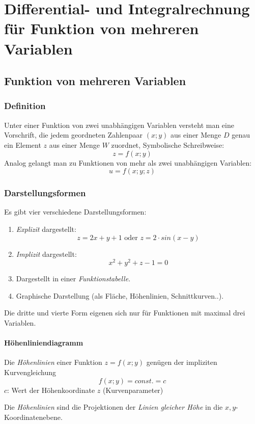 \chapter{Differential- und Integralrechnung für Funktion von mehreren Variablen}
\section{Funktion von mehreren Variablen}
\subsection{Definition}
\begin{definition}
Unter einer Funktion von zwei unabhängigen Variablen versteht man eine Vorschrift, die jedem geordneten Zahlenpaar $(x;y)$ aus einer Menge $D$ genau ein Element $z$ aus einer Menge $W$ zuordnet, Symbolische Schreibweise: $$z=f(x;y)$$
Analog gelangt man zu Funktionen von mehr als zwei unabhängigen Variablen:
$$u=f(x;y;z)$$

\subsection{Darstellungsformen}
Es gibt vier verschiedene Darstellungsformen:
\begin{enumerate}
	\item \textit{Explizit} dargestellt:
	$$z = 2x + y + 1 \text{ oder } z = 2 \cdot sin(x-y)$$
	\item \textit{Implizit} dargestellt:
	$$ x^2 + y^2+z -1 = 0$$
	\item Dargestellt in einer \textit{Funktionstabelle}.
	\item Graphische Darstellung (als Fläche, Höhenlinien, Schnittkurven..).
\end{enumerate}
Die dritte und vierte Form eigenen sich nur für Funktionen mit maximal drei Variablen.
\end{definition}

\subsubsection{Höhenliniendiagramm}
\begin{definition}
Die \textit{Höhenlinien} einer Funktion $z=f(x;y)$ genügen der impliziten Kurvengleichung
$$f(x;y) = const. = c$$
$c$: Wert der Höhenkoordinate $z$ (Kurvenparameter)
\end{definition}
Die \textit{Höhenlinien} sind die Projektionen der \textit{Linien gleicher Höhe} in die $x, y$-Koordinatenebene.


